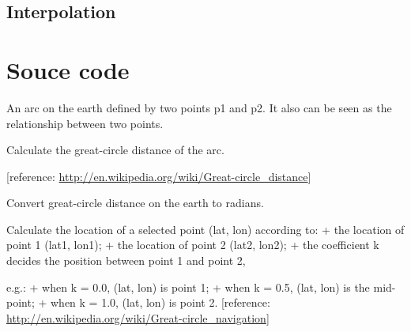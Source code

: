\documentclass[letterpaper,10pt,english]{sphinxmanual}
\begin{document}
\section{Interpolation}
\label{regridding:interpolation}

\chapter{Souce code}
\label{code:souce-code}\label{code:module-pyesg}\label{code::doc}

\begin{fulllineitems}
\label{code:pyesg.Arc}
An arc on the earth defined by two points p1 and p2.
It also can be seen as the relationship between two points.

\begin{fulllineitems}
\label{code:pyesg.Arc.distance}
Calculate the great-circle distance of the arc.

{[}reference: \href{http://en.wikipedia.org/wiki/Great-circle\_distance}{http://en.wikipedia.org/wiki/Great-circle\_distance}{]}

\end{fulllineitems}


\begin{fulllineitems}
\label{code:pyesg.Arc.rad}
Convert great-circle distance on the earth to radians.

\end{fulllineitems}


\begin{fulllineitems}
\label{code:pyesg.Arc.waypoint}
Calculate the location of a selected point (lat, lon) according to:
+ the location of point 1 (lat1, lon1);
+ the location of point 2 (lat2, lon2);
+ the coefficient k decides the position between point 1 and point 2,

e.g.:
+ when k = 0.0, (lat, lon) is point 1;
+ when k = 0.5, (lat, lon) is the mid-point;
+ when k = 1.0, (lat, lon) is point 2.
{[}reference: \href{http://en.wikipedia.org/wiki/Great-circle\_navigation}{http://en.wikipedia.org/wiki/Great-circle\_navigation}{]}

\end{fulllineitems}


\end{fulllineitems}
\end{document}
